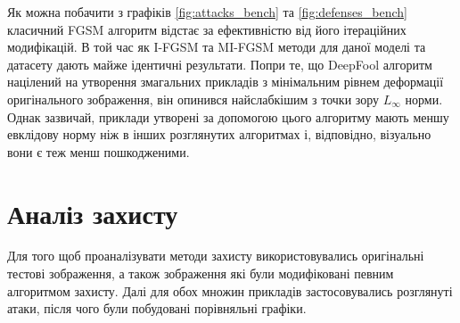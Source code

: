 \documentclass[a4paper,14pt]{extreport}
\begin{document}
	Як можна побачити з графіків \ref{fig:attacks_bench} та \ref{fig:defenses_bench} класичний FGSM алгоритм відстає за ефективністю від його  ітераційних модифікацій. В той час як I-FGSM та MI-FGSM методи для даної моделі та датасету дають майже ідентичні результати. Попри те, що DeepFool алгоритм націлений на утворення змагальних прикладів з мінімальним рівнем деформації оригінального зображення, він опинився найслабкішим з точки зору $L_{\infty}$ норми. Однак зазвичай, приклади утворені за допомогою цього алгоритму мають меншу евклідову норму ніж в інших розглянутих алгоритмах і, відповідно, візуально вони є теж менш пошкодженими. 
	
	\section{Аналіз захисту}
	Для того щоб проаналізувати методи захисту використовувались оригінальні тестові зображення, а також зображення які були модифіковані певним алгоритмом захисту. Далі для обох множин прикладів застосовувались розглянуті атаки, після чого були побудовані порівняльні графіки.
\end{document}
